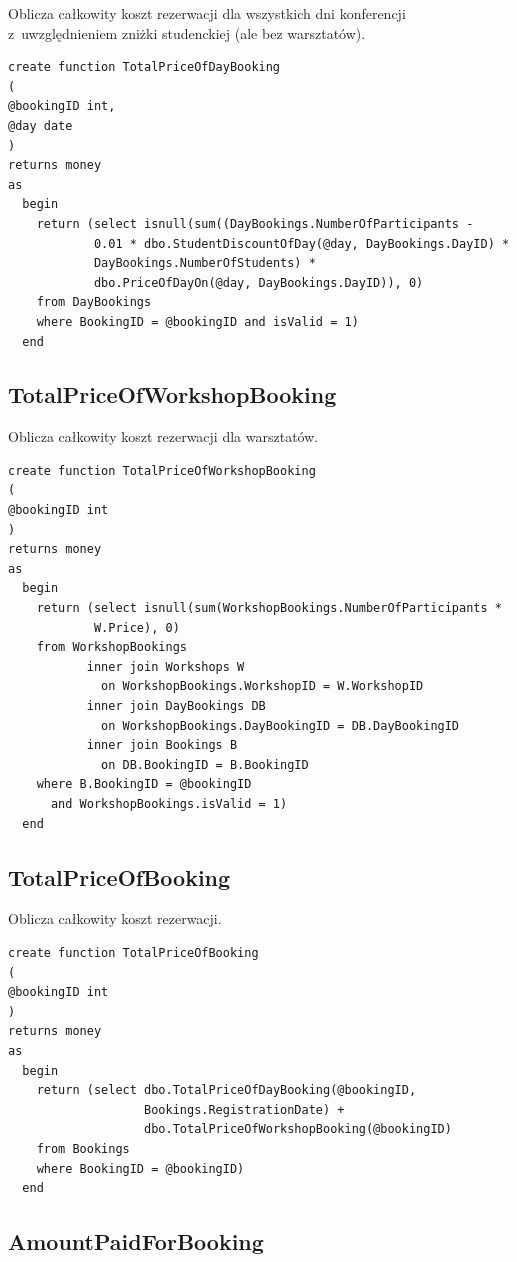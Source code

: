 \documentclass[12pt, a4paper]{mwrep}
\begin{document}
\noindent Oblicza całkowity koszt rezerwacji dla wszystkich dni konferencji z~uwzględnieniem zniżki studenckiej (ale bez warsztatów).
\begin{lstlisting}
create function TotalPriceOfDayBooking
(
@bookingID int,
@day date
)
returns money
as
  begin
    return (select isnull(sum((DayBookings.NumberOfParticipants - 
            0.01 * dbo.StudentDiscountOfDay(@day, DayBookings.DayID) * 
            DayBookings.NumberOfStudents) * 
            dbo.PriceOfDayOn(@day, DayBookings.DayID)), 0)
    from DayBookings
    where BookingID = @bookingID and isValid = 1)
  end
\end{lstlisting}

\subsection{TotalPriceOfWorkshopBooking}

\noindent Oblicza całkowity koszt rezerwacji dla warsztatów.
\begin{lstlisting}
create function TotalPriceOfWorkshopBooking
(
@bookingID int
)
returns money
as
  begin
    return (select isnull(sum(WorkshopBookings.NumberOfParticipants * 
            W.Price), 0)
    from WorkshopBookings
           inner join Workshops W
             on WorkshopBookings.WorkshopID = W.WorkshopID
           inner join DayBookings DB
             on WorkshopBookings.DayBookingID = DB.DayBookingID
           inner join Bookings B
             on DB.BookingID = B.BookingID
    where B.BookingID = @bookingID 
      and WorkshopBookings.isValid = 1)
  end
\end{lstlisting}

\subsection{TotalPriceOfBooking}

\noindent Oblicza całkowity koszt rezerwacji.
\begin{lstlisting}
create function TotalPriceOfBooking
(
@bookingID int
)
returns money
as
  begin
    return (select dbo.TotalPriceOfDayBooking(@bookingID, 
                   Bookings.RegistrationDate) + 
                   dbo.TotalPriceOfWorkshopBooking(@bookingID)
    from Bookings
    where BookingID = @bookingID)
  end
\end{lstlisting}

\subsection{AmountPaidForBooking}
\end{document}

